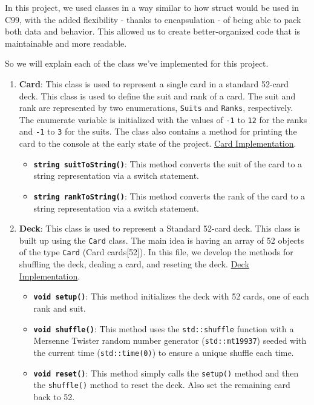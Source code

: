 \hspace{1cm} In this project, we used classes in a way similar to how struct would be used in C99, with the added flexibility - thanks to encapsulation - of being able to pack both data and behavior. This allowed us to create better-organized code that is maintainable and more readable.

\vspace{0.5cm}

\hspace{1cm} So we will explain each of the class we've implemented for this project.

\begin{enumerate}
    \item \textbf{Card}: This class is used to represent a single card in a standard 52-card deck. This class is used to define the suit and rank of a card. The suit and rank are represented by two enumerations, \texttt{Suits} and \texttt{Ranks}, respectively. The enumerate variable is initialized with the values of \texttt{-1} to \texttt{12} for the ranks and \texttt{-1} to \texttt{3} for the suits. The class also contains a method for printing the card to the console at the early state of the project. \href{https://github.com}{Card Implementation}.
    \begin{itemize}
        \item \textbf{\texttt{string suitToString()}}: This method converts the suit of the card to a string representation via a switch statement.
        \item \textbf{\texttt{string rankToString()}}: This method converts the rank of the card to a string representation via a switch statement.
    \end{itemize}

    \item \textbf{Deck}: This class is used to represent a Standard 52-card deck. This class is built up using the \texttt{Card} class. The main idea is having an array of 52 objects of the type \texttt{Card} (Card cards[52]). In this file, we develop the methods for shuffling the deck, dealing a card, and reseting the deck. \href{https://github.com}{Deck Implementation}.
    \begin{itemize}
        \item \textbf{\texttt{void setup()}}: This method initializes the deck with 52 cards, one of each rank and suit.
        \item \textbf{\texttt{void shuffle()}}: This method uses the \texttt{std::shuffle} function with a Mersenne Twister random number generator (\texttt{std::mt19937}) seeded with the current time (\texttt{std::time(0)}) to ensure a unique shuffle each time.
        \item \textbf{\texttt{void reset()}}: This method simply calls the \texttt{setup()} method and then the \texttt{shuffle()} method to reset the deck. Also set the remaining card back to 52.
    \end{itemize}


\end{enumerate}
